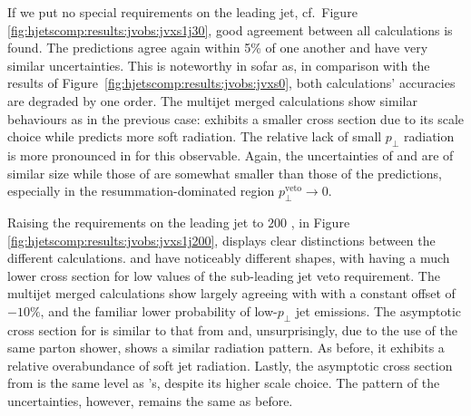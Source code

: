 {If we put no special requirements on the leading jet, cf.\ Figure 
\ref{fig:hjetscomp:results:jvobs:jvxs1j30}, good agreement 
between all calculations is found. The \NNLOPS predictions agree again within 
5\% of one another and have very similar uncertainties. This is noteworthy 
in sofar as, in comparison with the results of 
Figure~\ref{fig:hjetscomp:results:jvobs:jvxs0}, both calculations' 
accuracies are degraded by one order. The multijet merged calculations 
show similar behaviours as in the previous case: \MGaMC exhibits a smaller cross section due to 
its scale choice while \Sherpa \MEPSatNLO predicts more soft radiation. 
The relative lack of small $p_\perp$ radiation is more 
pronounced in \Herwig for this observable. Again, the uncertainties of \MGaMC and \Sherpa 
are of similar size while those of \Herwig are somewhat smaller than those of the \NNLOPS 
predictions, especially in the resummation-dominated region 
$p_\perp^\text{veto}\to 0$.

Raising the requirements on the leading jet to $200$ \gev, in Figure 
\ref{fig:hjetscomp:results:jvobs:jvxs1j200}, displays clear distinctions 
between the different calculations.  
\Sherpa \NNLOPS and \Powheg \NNLOPS have noticeably different shapes, with \Sherpa having a 
much lower cross section for low values of the sub-leading jet veto requirement. 
The multijet merged calculations show \Herwig largely agreeing with 
\Powheg with a constant offset of $-10\%$, and the familiar lower 
probability of low-$p_\perp$ jet emissions. 
The asymptotic cross section for \Sherpa \MEPSatNLO is similar to that from \Sherpa \NNLOPS and, 
unsurprisingly, due to the use of the same parton shower, shows a 
similar radiation pattern. As before, it exhibits 
a relative overabundance of soft jet radiation. Lastly, the asymptotic cross section from \MGaMC 
is the same level as \Powheg's, despite 
its higher scale choice. The pattern of the uncertainties, however, 
remains the same as before.

}
